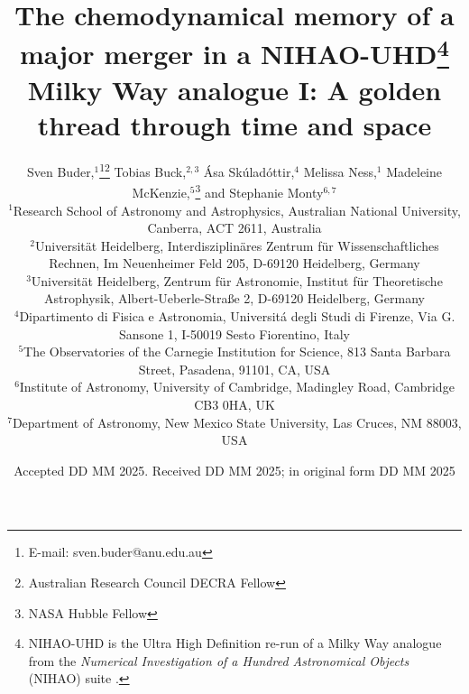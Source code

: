 \documentclass[fleqn,usenatbib]{mnras}
\title[A golden thread through time and space]{The chemodynamical memory of a major merger in a NIHAO-UHD\thanks{NIHAO-UHD is the Ultra High Definition re-run of a Milky Way analogue from the \textit{Numerical Investigation of a Hundred Astronomical Objects} (NIHAO) suite \citep{Wang2015}.} Milky Way analogue I: A golden thread through time and space}
\author[S. Buder et al.]{Sven Buder,$^{1}$\thanks{E-mail: sven.buder@anu.edu.au}\thanks{Australian Research Council DECRA Fellow}\orcidlink{0000-0002-4031-8553}
Tobias Buck,$^{2,3}$\orcidlink{0000-0003-2027-399X}
Ása Skúladóttir,$^{4}$\orcidlink{0000-0001-9155-9018}
Melissa Ness,$^{1}$\orcidlink{0000-0001-5082-6693}
Madeleine McKenzie,$^{5}$\thanks{NASA Hubble Fellow}\orcidlink{0000-0002-1715-1257}
and\newauthor
Stephanie Monty$^{6, 7}$\orcidlink{0000-0002-9225-5822}
\\
$^{1}$Research School of Astronomy and Astrophysics, Australian National University, Canberra, ACT 2611, Australia\\
$^{2}$Universit{\"a}t Heidelberg, Interdisziplin{\"a}res Zentrum f{\"u}r Wissenschaftliches Rechnen, Im Neuenheimer Feld 205, D-69120 Heidelberg, Germany\\
$^{3}$Universit{\"a}t Heidelberg, Zentrum f{\"u}r Astronomie, Institut f{\"u}r Theoretische Astrophysik, Albert-Ueberle-Straße 2, D-69120 Heidelberg, Germany\\
$^{4}$Dipartimento di Fisica e Astronomia, Universitá degli Studi di Firenze, Via G. Sansone 1, I-50019 Sesto Fiorentino, Italy\\
$^{5}$The Observatories of the Carnegie Institution for Science, 813 Santa Barbara Street, Pasadena, 91101, CA, USA\\
$^{6}$Institute of Astronomy, University of Cambridge, Madingley Road, Cambridge CB3 0HA, UK\\
$^{7}$Department of Astronomy, New Mexico State University, Las Cruces, NM 88003, USA
}
\date{Accepted DD MM 2025. Received DD MM 2025; in original form DD MM 2025}
\begin{document}
\label{firstpage}
\pagerange{\pageref{firstpage}--\pageref{lastpage}}
\maketitle

\begin{abstract} %

\end{abstract}
\end{document}
